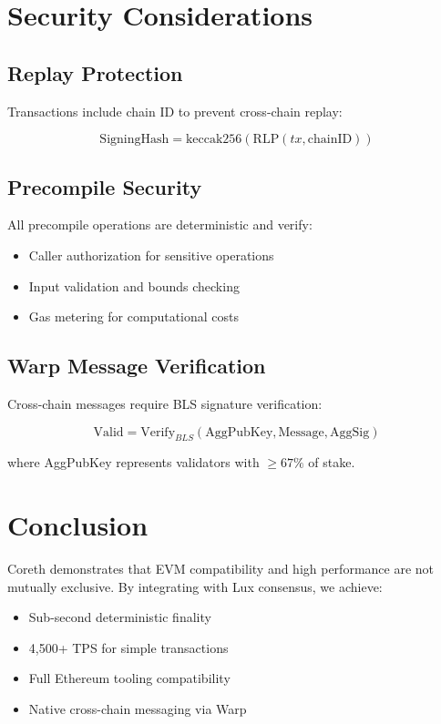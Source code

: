 \documentclass[11pt,letterpaper]{article}
\begin{document}
\section{Security Considerations}

\subsection{Replay Protection}

Transactions include chain ID to prevent cross-chain replay:

\begin{equation}
\text{SigningHash} = \text{keccak256}(\text{RLP}(tx, \text{chainID}))
\end{equation}

\subsection{Precompile Security}

All precompile operations are deterministic and verify:
\begin{itemize}
    \item Caller authorization for sensitive operations
    \item Input validation and bounds checking
    \item Gas metering for computational costs
\end{itemize}

\subsection{Warp Message Verification}

Cross-chain messages require BLS signature verification:

\begin{equation}
\text{Valid} = \text{Verify}_{BLS}(\text{AggPubKey}, \text{Message}, \text{AggSig})
\end{equation}

where AggPubKey represents validators with $\geq 67\%$ of stake.

\section{Conclusion}

Coreth demonstrates that EVM compatibility and high performance are not mutually exclusive. By integrating with Lux consensus, we achieve:

\begin{itemize}
    \item Sub-second deterministic finality
    \item 4,500+ TPS for simple transactions
    \item Full Ethereum tooling compatibility
    \item Native cross-chain messaging via Warp
\end{itemize}
\end{document}

